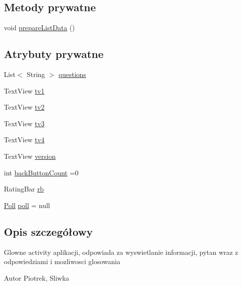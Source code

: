 \subsection*{Metody prywatne}
\begin{DoxyCompactItemize}
\item 
void \hyperlink{classcom_1_1example_1_1qrpoll_1_1_poll_activity_a1081f69211873eaf38c422ea12c769f0}{prepare\+List\+Data} ()
\end{DoxyCompactItemize}
\subsection*{Atrybuty prywatne}
\begin{DoxyCompactItemize}
\item 
List$<$ String $>$ \hyperlink{classcom_1_1example_1_1qrpoll_1_1_poll_activity_ae9caea6dcd77802d9edc7f86ace0fc5c}{questions}
\item 
Text\+View \hyperlink{classcom_1_1example_1_1qrpoll_1_1_poll_activity_a7928323c2d0f40aa25420488718de309}{tv1}
\item 
Text\+View \hyperlink{classcom_1_1example_1_1qrpoll_1_1_poll_activity_a48f7da0dc1da430cd5ac90a8376cad70}{tv2}
\item 
Text\+View \hyperlink{classcom_1_1example_1_1qrpoll_1_1_poll_activity_a70708751ea7eb8a32569447a087471b8}{tv3}
\item 
Text\+View \hyperlink{classcom_1_1example_1_1qrpoll_1_1_poll_activity_a32c7797e7d6cdf269f9449cfdb635438}{tv4}
\item 
Text\+View \hyperlink{classcom_1_1example_1_1qrpoll_1_1_poll_activity_a4fbbfc95809c5aa0bf9916316730a992}{version}
\item 
int \hyperlink{classcom_1_1example_1_1qrpoll_1_1_poll_activity_a0cb80128cd6ae3abb14437dbcf82f876}{back\+Button\+Count} =0
\item 
Rating\+Bar \hyperlink{classcom_1_1example_1_1qrpoll_1_1_poll_activity_a3c2b3e0864209b0253263a7af2642a13}{rb}
\item 
\hyperlink{classcom_1_1example_1_1qrpoll_1_1_poll}{Poll} \hyperlink{classcom_1_1example_1_1qrpoll_1_1_poll_activity_accbd807fe57852d64377c5a96401c376}{poll} = null
\end{DoxyCompactItemize}


\subsection{Opis szczegółowy}
Glowne activity aplikacji, odpowiada za wyswietlanie informacji, pytan wraz z odpowiedziami i mozliwosci glosowania \begin{DoxyAuthor}{Autor}
Piotrek, Sliwka 
\end{DoxyAuthor}


